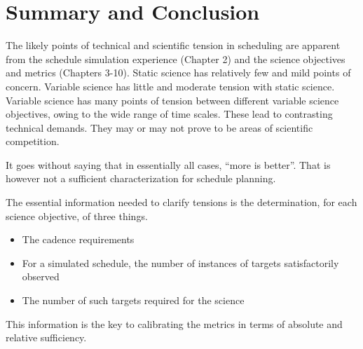 
\section{Summary and Conclusion}

The likely points of technical and scientific tension in scheduling are
apparent from the schedule simulation experience (Chapter 2) and the
science objectives and metrics (Chapters 3-10).  Static science has
relatively few and mild points of concern.  Variable science has little
and moderate tension with static science.  Variable science has many
points of tension between different variable science objectives, owing
to the wide range of time scales. These lead to contrasting technical
demands.  They may or may not prove to be areas of scientific
competition.

It goes without saying that in essentially all cases, ``more is
better''.  That is however not a sufficient characterization for
schedule planning.

The essential information needed to clarify tensions is the
determination, for each science objective, of three things.
\begin{itemize}
	\item The cadence requirements
	\item For a simulated schedule, the number of instances of targets satisfactorily observed
	\item The number of such targets required for the science
\end{itemize}

This information is the key to calibrating the metrics in terms of
absolute and relative  sufficiency.

